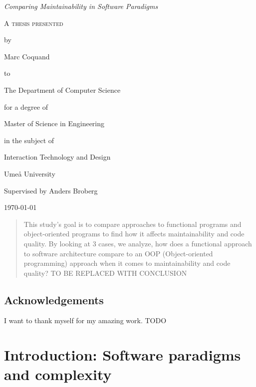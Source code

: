 \documentclass[12pt]{report}
\theoremstyle{definition}
\theoremstyle{theorem}
\begin{document}
\begin{titlepage}
	\centering
    \null
    \vfill
    {\Large\itshape Comparing Maintainability in Software Paradigms
    \par}
    \vspace{3.0cm}
	{\scshape 
    A thesis presented \par 
    by\par
	Marc Coquand\par
	to\par
    The Department of Computer Science\par
    \vspace{0.8cm}
	for a degree of\par
    Master of Science in Engineering\par
    in the subject of\par
    Interaction Technology and Design\par}
    \vfill
    Umeå University\par
    Supervised by Anders Broberg\par
	\today\par
\end{titlepage}
\clearpage
\thispagestyle{empty}

\clearpage\newpage
\thispagestyle{empty}

\begin{abstract} 

    This study's goal is to compare approaches to functional programs and
    object-oriented programs to find how it affects maintainability and code
    quality. By looking at 3 cases, we analyze, how does a functional approach
    to software architecture compare to an OOP (Object-oriented programming)
    approach when it comes to maintainability and code quality? TO BE REPLACED
    WITH CONCLUSION

\end{abstract}

\clearpage\newpage
\thispagestyle{empty}

\section*{Acknowledgements}

I want to thank myself for my amazing work. TODO

\clearpage\newpage
\thispagestyle{empty}

\tableofcontents
\newpage

\chapter{Introduction: Software paradigms and complexity}
\end{document}
